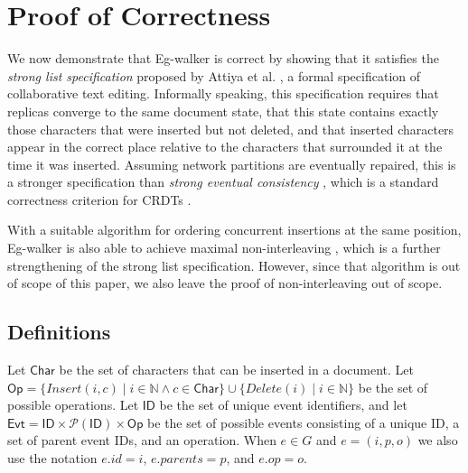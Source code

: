 \documentclass[sigplan,10pt]{acmart}
\newcommand{\algname}{Eg-walker\xspace}
\begin{document}
\clearpage
\section{Proof of Correctness}\label{proofs}

We now demonstrate that \algname is correct by showing that it satisfies the \emph{strong list specification} proposed by Attiya et al. \cite{Attiya2016}, a formal specification of collaborative text editing.
Informally speaking, this specification requires that replicas converge to the same document state, that this state contains exactly those characters that were inserted but not deleted, and that inserted characters appear in the correct place relative to the characters that surrounded it at the time it was inserted.
Assuming network partitions are eventually repaired, this is a stronger specification than \emph{strong eventual consistency} \cite{Shapiro2011}, which is a standard correctness criterion for CRDTs \cite{Gomes2017verifying}.

With a suitable algorithm for ordering concurrent insertions at the same position, \algname is also able to achieve maximal non-interleaving \cite{fugue}, which is a further strengthening of the strong list specification.
However, since that algorithm is out of scope of this paper, we also leave the proof of non-interleaving out of scope.

\subsection{Definitions}

Let $\mathsf{Char}$ be the set of characters that can be inserted in a document.
Let $\mathsf{Op} = \{\mathit{Insert}(i, c) \mid i \in \mathbb{N} \wedge c \in \mathsf{Char}\} \cup \{\mathit{Delete}(i) \mid i \in \mathbb{N}\}$ be the set of possible operations.
Let $\mathsf{ID}$ be the set of unique event identifiers, and let $\mathsf{Evt} = \mathsf{ID} \times \mathcal{P}(\mathsf{ID}) \times \mathsf{Op}$ be the set of possible events consisting of a unique ID, a set of parent event IDs, and an operation.
When $e \in G$ and $e = (i,p,o)$ we also use the notation $e.\mathit{id} = i$, $e.\mathit{parents} = p$, and $e.\mathit{op} = o$.
\end{document}
